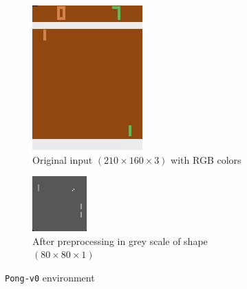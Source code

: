 \documentclass{article}
\begin{document}
\begin{figure}[H]
\centering
\begin{subfigure}[b]{.5\textwidth}
  \centering
  \includegraphics[width=.25\linewidth]{pong}
  \caption{Original input $ (210 \times 160 \times 3) $ with RGB colors}
  \label{fig:pong}
\end{subfigure}%
\begin{subfigure}[b]{.5\textwidth}
  \centering
  \includegraphics[width=.15\linewidth]{pong_grey}
  \caption{After preprocessing in grey scale of shape $ (80 \times 80 \times 1 ) $}
  \label{fig:pong_grey}
\end{subfigure}
\caption{\texttt{Pong-v0} environment}
\label{fig:pong_env}
\end{figure}
\end{document}
